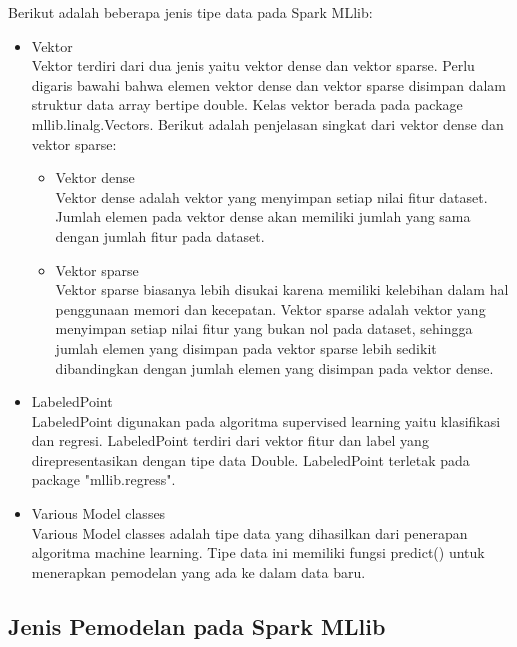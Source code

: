 \newpage
\noindent Berikut adalah beberapa jenis tipe data pada Spark MLlib:

\begin{itemize}
\item Vektor\\
Vektor terdiri dari dua jenis yaitu vektor dense dan vektor sparse. Perlu digaris bawahi bahwa elemen vektor dense dan vektor sparse disimpan dalam struktur data array bertipe double. Kelas vektor berada pada package mllib.linalg.Vectors. Berikut adalah penjelasan singkat dari vektor dense dan vektor sparse:

\begin{itemize}

\item Vektor dense\\
Vektor dense adalah vektor yang menyimpan setiap nilai fitur dataset. Jumlah elemen pada vektor dense akan memiliki jumlah yang sama dengan jumlah fitur pada dataset. \\

\item Vektor sparse\\
Vektor sparse biasanya lebih disukai karena memiliki kelebihan dalam hal penggunaan memori dan kecepatan. Vektor sparse adalah vektor yang menyimpan setiap nilai fitur yang bukan nol pada dataset, sehingga jumlah elemen yang disimpan pada vektor sparse lebih sedikit dibandingkan dengan jumlah elemen yang disimpan pada vektor dense. 

\end{itemize}

\item LabeledPoint\\
LabeledPoint digunakan pada algoritma supervised learning yaitu klasifikasi dan regresi. LabeledPoint terdiri dari vektor fitur dan label yang direpresentasikan dengan tipe data Double. LabeledPoint terletak pada package "mllib.regress".

\item Various Model classes\\
Various Model classes adalah tipe data yang dihasilkan dari penerapan algoritma machine learning. Tipe data ini memiliki fungsi predict() untuk menerapkan pemodelan yang ada ke dalam data baru.

\end{itemize}

\subsection{Jenis Pemodelan pada Spark MLlib}

